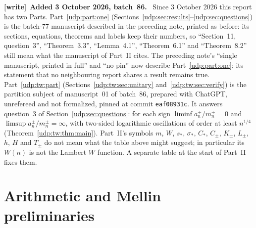 \documentclass[11pt]{article}
\theoremstyle{remark}\newtheorem{remark}[theorem]{Remark}
\newenvironment{writenote}[1][]{\par\smallskip\begingroup\small
 \noindent\textbf{[write]}\if\relax\detokenize{#1}\relax\else~\textbf{#1.}\fi\ }%
 {\par\endgroup\smallskip}
\numberwithin{equation}{section}
\begin{document}
\begin{writenote}[Added 3 October 2026, batch~86]
Since 3 October 2026 this report has two Parts. Part~\ref{udp:part:one}
(Sections~\ref{udp:sec:results}--\ref{udp:sec:questions}) is the batch-77
manuscript described in the preceding note, printed as before: its
sections, equations, theorems and labels keep their numbers, so
``Section~11, question~3'', ``Theorem~3.3'', ``Lemma~4.1'', ``Theorem~6.1''
and ``Theorem~8.2'' still mean what the manuscript of Part~II cites. The
preceding note's ``single manuscript, printed in full'' and ``no pin'' now
describe Part~\ref{udp:part:one}; its statement that no neighbouring report
shares a result remains true. Part~\ref{udp:tw:part}
(Sections~\ref{udp:tw:sec:unitary} and~\ref{udp:tw:sec:verify}) is the
partition subject of manuscript~01 of batch~86, prepared with ChatGPT,
unrefereed and not formalized, pinned at commit \texttt{eaf08931c}. It
answers question~3 of Section~\ref{udp:sec:questions}: for each sign
$\liminf a_n^\pm/m_n^\pm=0$ and $\limsup a_n^\pm/m_n^\pm=\infty$, with
two-sided logarithmic oscillations of order at least $n^{1/4}$
(Theorem~\ref{udp:tw:thm:main}). Part~II's symbols $m$, $W$, $s_*$,
$\sigma_*$, $C_*$, $C_\pm$, $K_\pm$, $L_\pm$, $h$, $H$ and $T_\pm$ do not mean
what the table above might suggest; in particular its $W(n)$ is not the
Lambert $W$ function. A separate table at the start of Part~II fixes them.
\end{writenote}

\section{Arithmetic and Mellin preliminaries}\label{udp:sec:mellin}
\end{document}
